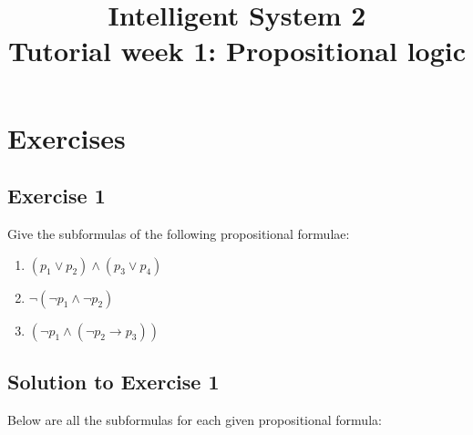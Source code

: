 \documentclass[11pt]{article}
\title{
    Intelligent System 2\\
    Tutorial week 1: Propositional logic
}
\begin{document}
    \maketitle

    \section{Exercises}
    \label{sec:exercises}

    \subsection*{Exercise 1}

    Give the subformulas of the following propositional formulae:

    \begin{enumerate}
        \item $(p_1 \vee p_2) \wedge (p_3 \vee p_4)$
        \item $\neg (\neg p_1 \wedge \neg p_2)$
        \item $(\neg p_1 \wedge (\neg p_2 \rightarrow p_3))$
    \end{enumerate}

    \subsection*{Solution to Exercise 1}

    Below are all the subformulas for each given propositional formula:
\end{document}
